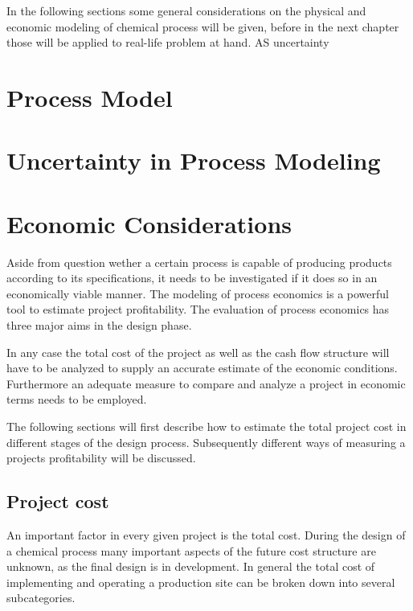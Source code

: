In the following sections some general considerations on the physical and economic modeling of chemical process will be given, before in the next chapter those will be applied to real-life problem at hand. AS uncertainty 

\section{Process Model}
\label{sec:process_model}

\section{Uncertainty in Process Modeling}
\label{sec:uncertainty}

\section{Economic Considerations}
\label{sec:uncertainty}

Aside from question wether a certain process is capable of producing products according to its 
specifications, it needs to be investigated if it does so in an economically viable manner. The modeling 
of process economics is a powerful tool to estimate project profitability. The evaluation of process 
economics has three major aims in the design phase. 

%

In any case the total cost of the project as well as the cash flow structure will have to be analyzed to supply 
an accurate estimate of the economic conditions. Furthermore an adequate measure to compare and 
analyze a project in economic terms needs to be employed. 

The following sections will first describe how to estimate the total project cost in different stages of the 
design process. Subsequently different ways of measuring a projects profitability will be discussed. 

\subsection{Project cost}
An important factor in every given project is the total cost. During the design of a chemical process many 
important aspects of the future cost structure are unknown, as the final design is in development. In 
general the total cost of implementing and operating a production site can be broken down into several 
subcategories. 

